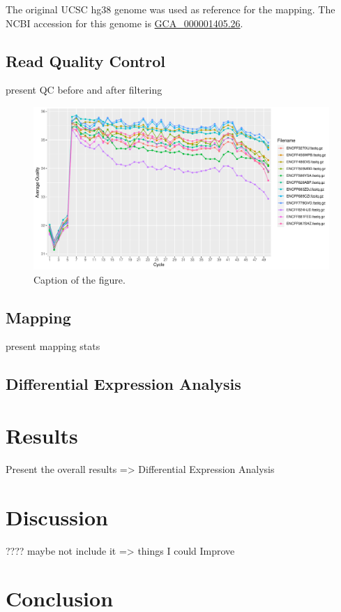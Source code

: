 \documentclass[a4paper, 11pt]{article}
\begin{document}
\begin{multicols}{2}
The original UCSC hg38 genome was used as reference for the mapping. The NCBI accession for this genome is \href{https://www.ncbi.nlm.nih.gov/datasets/genome/GCF_000001405.26/}{GCA\_000001405.26}.


\subsection{Read Quality Control}
present QC before and after filtering

\begin{figure}[H]
    \centering
    \includegraphics[width=1\columnwidth]{Figures/QC_plots/Cycle_Mean_quality.pdf}
    \caption{Caption of the figure.}
    \label{fig:example}
\end{figure}

\subsection{Mapping}
present mapping stats
\subsection{Differential Expression Analysis}

\section{Results}

Present the overall results => Differential Expression Analysis


\section{Discussion}
???? maybe not include it
=> things I could Improve


\section{Conclusion}




\end{multicols}
\end{document}
